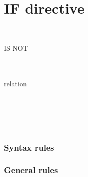 \section{IF directive}

\begin{syntax}
  \begin{1=}
    \directiveindicator \\
    \miscext{\textdollar}
  \end{1=}
    IS NOT
  \begin{1=}
     \\
     \\
    relation \\
  \end{1=}

  \sourcetext


  \begin{0-1}
    \begin{1=}
      \directiveindicator \\
      \miscext{\textdollar}
    \end{1=}
     \sourcetext
  \end{0-1}

  \begin{0-1}
    \directiveindicator{} \\
     \\
  \end{0-1}
\end{syntax}

\subsubsection{Syntax rules}

\subsubsection{General rules}

